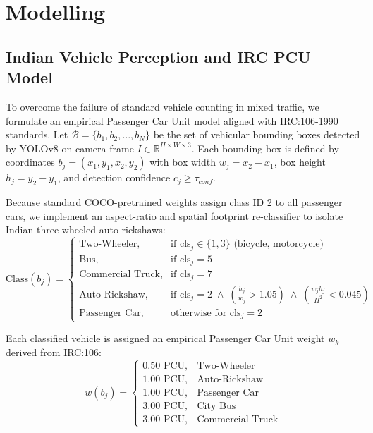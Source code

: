 \section{Modelling}
\label{sec:modelling}

\subsection{Indian Vehicle Perception and IRC PCU Model}
\label{subsec:pcu_model}
To overcome the failure of standard vehicle counting in mixed traffic, we formulate an empirical Passenger Car Unit model aligned with IRC:106-1990 standards. Let $\mathcal{B} = \{b_1, b_2, \dots, b_N\}$ be the set of vehicular bounding boxes detected by YOLOv8 on camera frame $I \in \mathbb{R}^{H \times W \times 3}$. Each bounding box is defined by coordinates $b_j = (x_1, y_1, x_2, y_2)$ with box width $w_j = x_2 - x_1$, box height $h_j = y_2 - y_1$, and detection confidence $c_j \ge \tau_{conf}$.

Because standard COCO-pretrained weights assign class ID 2 to all passenger cars, we implement an aspect-ratio and spatial footprint re-classifier to isolate Indian three-wheeled auto-rickshaws:
\begin{equation}
\text{Class}(b_j) = 
\begin{cases}
\text{Two-Wheeler}, & \text{if } \text{cls}_j \in \{1, 3\} \text{ (bicycle, motorcycle)} \\
\text{Bus}, & \text{if } \text{cls}_j = 5 \\
\text{Commercial Truck}, & \text{if } \text{cls}_j = 7 \\
\text{Auto-Rickshaw}, & \text{if } \text{cls}_j = 2 \;\land\; \left(\frac{h_j}{w_j} > 1.05\right) \;\land\; \left(\frac{w_j h_j}{H^2} < 0.045\right) \\
\text{Passenger Car}, & \text{otherwise for } \text{cls}_j = 2
\end{cases}
\end{equation}

Each classified vehicle is assigned an empirical Passenger Car Unit weight $w_k$ derived from IRC:106:
\begin{equation}
w(b_j) = 
\begin{cases}
0.50 \text{ PCU}, & \text{Two-Wheeler} \\
1.00 \text{ PCU}, & \text{Auto-Rickshaw} \\
1.00 \text{ PCU}, & \text{Passenger Car} \\
3.00 \text{ PCU}, & \text{City Bus} \\
3.00 \text{ PCU}, & \text{Commercial Truck}
\end{cases}
\end{equation}

